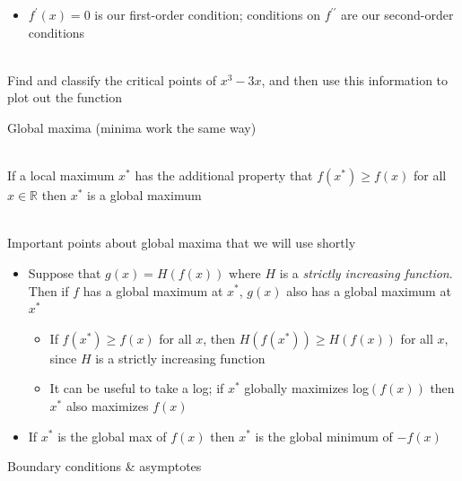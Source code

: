\documentclass[10pt]{seminar}
\begin{document}
\begin{slide}
\begin{itemize}
\begin{itemize}
\item If $f^{\prime\prime}(x^*)>0$ then $x^*$ is a local minimum
\item If $f^{\prime\prime}(x^*)<0$ then $x^*$ is a local maximum

\item If $f^{\prime\prime}(x^*)=0$ then we don't know what $x^*$ is; we have to examine our function around $x^*$

\end{itemize}

\item $f^\prime(x)=0$ is our first-order condition; conditions on $f^{\prime\prime}$ are our second-order conditions

\end{itemize}


\ \\Find and classify the critical points of $x^3-3x$, and then use this information to plot out the function

\newslide

Global maxima (minima work the same way)

\ \\If a local maximum $x^*$ has the additional property that $f(x^*)\geq f(x)$ for all $x\in \mathbb{R}$ then $x^*$ is a global maximum %

\ \\Important points about global maxima that we will use shortly

\begin{itemize}
\item Suppose that $g(x)=H(f(x))$ where $H$ is a \textit{strictly increasing function}.  Then if $f$ has a global maximum at $x^*$, $g(x)$ also has a global maximum at $x^*$
\begin{itemize}
\item If $f(x^*)\geq f(x)$ for all $x$, then $H(f(x^*))\geq H(f(x))$ for all $x$, since $H$ is a strictly increasing function
\item It can be useful to take a log; if $x^*$ globally maximizes log$(f(x))$ then $x^*$ also maximizes $f(x)$
\end{itemize}

\item If $x^*$ is the global max of $f(x)$ then $x^*$ is the global minimum of $-f(x)$
\end{itemize}

\newslide
Boundary conditions \& asymptotes


\end{slide}
\end{document}
